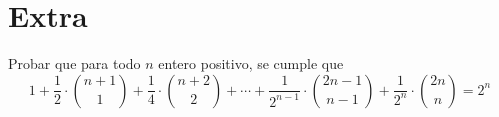 \section{Extra}

\begin{section-problem}
    Probar que para todo $n$ entero positivo, se cumple que
    \[1 + \frac{1}{2} \cdot \binom{n + 1}{1}  + \frac{1}{4} \cdot \binom{n + 2}{2}  + \cdots + \frac{1}{2^{n - 1}} \cdot \binom{2n - 1}{n - 1} + \frac{1}{2^n} \cdot \binom{2n}{n} = 2^n\]
\end{section-problem}